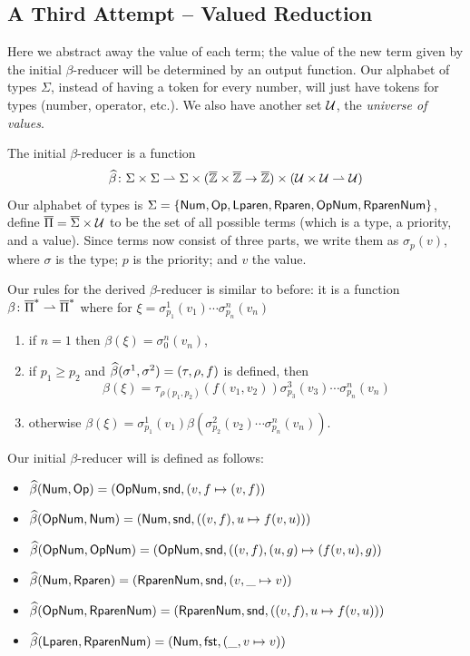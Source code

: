 \documentclass{llncs}
\begin{document}
\subsection{A Third Attempt -- Valued Reduction} \label{valued-reduction}

Here we abstract away the value of each term; the value of the new term given by the initial $\beta$-reducer will be determined by an output function.
Our alphabet of types $\Sigma$, instead of having a token for every number, will just have tokens for types (number, operator, etc.).
We also have another set $\mathcal U$, the \textit{universe of values}.

The initial $\beta$-reducer is a function
\[ \widehat\beta \colon \Sigma\times\Sigma \rightharpoonup \Sigma\times(\overline{\mathbb Z}\times\overline{\mathbb Z}\to\overline{\mathbb Z})\times(\mathcal U\times\mathcal U\rightharpoonup\mathcal U) \]
Our alphabet of types is $\Sigma=\set{\NUM,\OP,\LPAREN,\RPAREN,\OP\NUM,\RPAREN\NUM}$, define $\overline\Pi=\overline\Sigma\times\mathcal U$ to be the set of all possible terms (which is a type, a priority, and a value).
Since terms now consist of three parts, we write them as $\sigma_p(v)$, where $\sigma$ is the type; $p$ is the priority; and $v$ the value.

Our rules for the derived $\beta$-reducer is similar to before: it is a function $\beta\colon\overline\Pi^* \rightharpoonup \overline\Pi^*$ where for $\xi=\sigma^1_{p_1}(v_1)\cdots\sigma^n_{p_n}(v_n)$
\begin{enumerate}
    \item if $n=1$ then $\beta(\xi)=\sigma^n_0(v_n)$,
    \item if $p_1\geq p_2$ and $\widehat\beta(\sigma^1,\sigma^2)=(\tau,\rho,f)$ is defined, then
    \[ \beta(\xi)=\tau_{\rho(p_1,p_2)}(f(v_1,v_2))\sigma^3_{p_3}(v_3)\cdots\sigma^n_{p_n}(v_n) \]
    \item otherwise $\beta(\xi)=\sigma^1_{p_1}(v_1)\beta(\sigma^2_{p_2}(v_2)\cdots\sigma^n_{p_n}(v_n))$.
\end{enumerate}

Our initial $\beta$-reducer will is defined as follows:
\begin{itemize}
    \item $\widehat\beta(\mathsf{Num},\mathsf{Op})=(\mathsf{Op}\mathsf{Num},\mathsf{snd},(v,f\mapsto(v,f))$
    \item $\widehat\beta(\mathsf{Op}\mathsf{Num},\mathsf{Num})=(\mathsf{Num},\mathsf{snd},((v,f),u\mapsto f(v,u)))$
    \item $\widehat\beta(\mathsf{Op}\mathsf{Num},\mathsf{Op}\mathsf{Num})=(\mathsf{Op}\mathsf{Num},\mathsf{snd},((v,f),(u,g)\mapsto (f(v,u),g))$
    \item $\widehat\beta(\mathsf{Num},\mathsf{Rparen})=(\mathsf{Rparen}\mathsf{Num},\mathsf{snd},(v,\_\mapsto v))$
    \item $\widehat\beta(\mathsf{Op}\mathsf{Num},\mathsf{Rparen}\mathsf{Num})=(\mathsf{Rparen}\mathsf{Num},\mathsf{snd},((v,f),u\mapsto f(v,u)))$
    \item $\widehat\beta(\mathsf{Lparen},\mathsf{Rparen}\mathsf{Num})=(\mathsf{Num},\mathsf{fst},(\_,v\mapsto v))$
\end{itemize}
\end{document}

